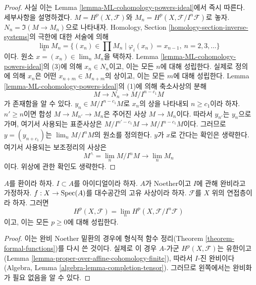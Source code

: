 \begin{proof}
사실 이는 Lemma \ref{lemma-ML-cohomology-powers-ideal}에서 즉시
따른다. 세부사항을 설명하겠다.
$M = H^p(X, \mathcal{F})$와
$M_n = H^p(X, \mathcal{F}/I^n\mathcal{F})$로 놓자.
$N_n = \Im(M \to M_n)$으로 나타내자. Homology, Section
\ref{homology-section-inverse-systems}의 극한에 대한 서술에 의해
$$
\lim_n M_n
=
\{(x_n) \in \prod M_n \mid \varphi_i(x_n) = x_{n - 1}, \ n = 2, 3, \ldots\}
$$
이다. 원소 $x = (x_n) \in \lim_n M_n$을 택하자. Lemma
\ref{lemma-ML-cohomology-powers-ideal}의 (3)에 의해 $x_n \in N_n$이고,
이는 모든 $n$에 대해 성립한다. 실제로 정의에 의해 $x_n$은 어떤
$x_{n + m} \in M_{n + m}$의 상이고, 이는 모든 $m$에 대해 성립한다.
Lemma
\ref{lemma-ML-cohomology-powers-ideal}의 (1)에 의해 축소사상의
분해
$$
M \to N_n \to M/I^{n - c_1}M
$$
가 존재함을 알 수 있다. $y_n \in M/I^{n - c_1}M$로 $x_n$의 상을
나타내되 $n \geq c_1$이라 하자. $n' \geq n$이면 합성
$M \to M_{n'} \to M_n$은 주어진 사상 $M \to M_n$이다. 따라서
$y_{n'}$는 $y_n$으로 가며, 여기서 사용되는 표준사상은
$M/I^{n' - c_1}M \to M/I^{n - c_1}M$이다.
그러므로 $y = (y_{n + c_1})$는 $\lim_n M/I^nM$의 원소를 정의한다.
$y$가 $x$로 간다는 확인은 생략한다. 여기서 사용되는 보조정리의
사상은
$$
M^\wedge = \lim_n M/I^nM \longrightarrow \lim_n M_n
$$
이다. 위상에 관한 확인도 생략한다.
\end{proof}

\begin{lemma}
\label{lemma-spell-out-theorem-formal-functions}
$A$를 환이라 하자. $I \subset A$를 아이디얼이라 하자. $A$가
Noether이고 $I$에 관해 완비라고 가정하자.
$f : X \to \mathop{\mathrm{Spec}}(A)$를 대수공간의 고유 사상이라 하자.
$\mathcal{F}$를 $X$ 위의 연접층이라 하자. 그러면
$$
H^p(X, \mathcal{F}) = \lim_n H^p(X, \mathcal{F}/I^n\mathcal{F})
$$
이고, 이는 모든 $p \geq 0$에 대해 성립한다.
\end{lemma}

\begin{proof}
이는 완비 Noether 밑환의 경우에 형식적 함수 정리(Theorem
\ref{theorem-formal-functions})를 다시 쓴 것이다. 실제로 이 경우
$A$-가군 $H^p(X, \mathcal{F})$는 유한이고(Lemma
\ref{lemma-proper-over-affine-cohomology-finite}), 따라서
$I$-진 완비이다(Algebra, Lemma
\ref{algebra-lemma-completion-tensor}). 그러므로 왼쪽에서는 완비화가
필요 없음을 알 수 있다.
\end{proof}

